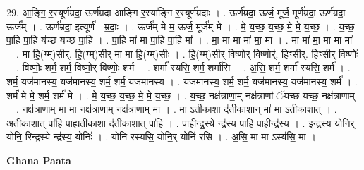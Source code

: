 \documentclass[17pt]{extarticle}
\begin{document}
29. आ॒ङ्गि॒ र॒स्यूर्ण॑म्रदा॒ ऊर्ण॑म्रदा आङ्गि र॒स्या᳚ङ्गि र॒स्यूर्ण॑म्रदाः । . ऊर्ण॑म्रदा॒ ऊर्ज॒ मूर्ज॒ मूर्ण॑म्रदा॒ ऊर्ण॑म्रदा॒ ऊर्ज᳚म् । . ऊर्ण॑म्रदा॒ इत्यूर्ण॑ - म्र॒दाः॒ । . ऊर्ज॑म् मे म॒ ऊर्ज॒ मूर्ज॑म् मे । . मे॒ य॒च्छ॒ य॒च्छ॒ मे॒ मे॒ य॒च्छ॒ । . य॒च्छ॒ पा॒हि पा॒हि य॑च्छ यच्छ पा॒हि । . पा॒हि मा॑ मा पा॒हि पा॒हि मा᳚ । . मा॒ मा मा मा॑ मा॒ मा । . मा मा॑ मा॒ मा मा मा᳚ । . मा॒ हि॒(ग्म्॒)सी॒र्॒. हि॒(ग्म्॒)सी॒र् मा॒ मा॒ हि॒(ग्म्॒)सीः॒ । . हि॒(ग्म्॒)सी॒र् विष्णो॒र् विष्णोर्॑. हिꣳसीर्. हिꣳसी॒र् विष्णोः᳚ । . विष्णोः॒ शर्म॒ शर्म॒ विष्णो॒र् विष्णोः॒ शर्म॑ । . शर्मा᳚ स्यसि॒ शर्म॒ शर्मा॑सि । . अ॒सि॒ शर्म॒ शर्मा᳚ स्यसि॒ शर्म॑ । . शर्म॒ यज॑मानस्य॒ यज॑मानस्य॒ शर्म॒ शर्म॒ यज॑मानस्य । . यज॑मानस्य॒ शर्म॒ शर्म॒ यज॑मानस्य॒ यज॑मानस्य॒ शर्म॑ । . शर्म॑ मे मे॒ शर्म॒ शर्म॑ मे । . मे॒ य॒च्छ॒ य॒च्छ॒ मे॒ मे॒ य॒च्छ॒ । . य॒च्छ॒ नक्ष॑त्राणा॒म् नक्ष॑त्राणां ॅयच्छ यच्छ॒ नक्ष॑त्राणाम् । . नक्ष॑त्राणाम् मा मा॒ नक्ष॑त्राणा॒म् नक्ष॑त्राणाम् मा । . मा॒ ऽती॒का॒शा द॑तीका॒शान् मा॑ मा ऽतीका॒शात् । . अ॒ती॒का॒शात् पा॑हि पाह्यतीका॒शा द॑तीका॒शात् पा॑हि । . पा॒हीन्द्र॒स्ये न्द्र॑स्य पाहि पा॒हीन्द्र॑स्य । . इन्द्र॑स्य॒ योनि॒र् योनि॒ रिन्द्र॒स्ये न्द्र॑स्य॒ योनिः॑ । . योनि॑ रस्यसि॒ योनि॒र् योनि॑ रसि । . अ॒सि॒ मा मा ऽस्य॑सि॒ मा । \newline

\textbf{Ghana Paata } \newline
\end{document}
